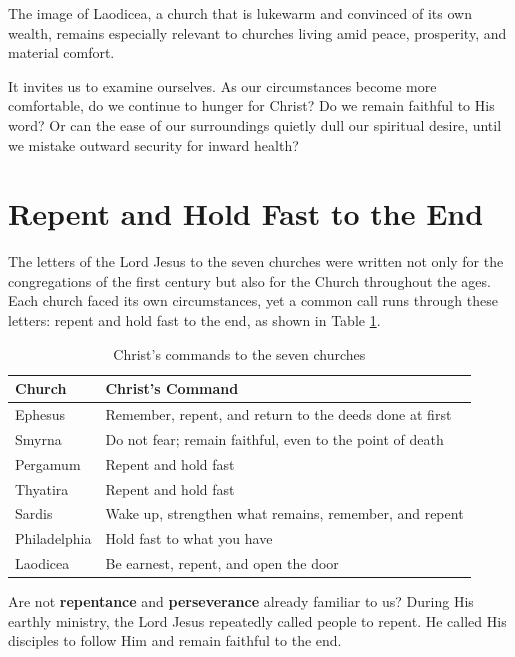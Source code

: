 The image of Laodicea, a church that is lukewarm and convinced of its own wealth, remains especially relevant to churches living amid peace, prosperity, and material comfort.

It invites us to examine ourselves. As our circumstances become more comfortable, do we continue to hunger for Christ? Do we remain faithful to His word? Or can the ease of our surroundings quietly dull our spiritual desire, until we mistake outward security for inward health?


\section{Repent and Hold Fast to the End}

The letters of the Lord Jesus to the seven churches were written not only for the congregations of the first century but also for the Church throughout the ages. Each church faced its own circumstances, yet a common call runs through these letters: repent and hold fast to the end, as shown in Table \ref{table:seven_commands}.

{
\renewcommand{\arraystretch}{1}
\small
\begin{longtable}{p{2.5cm}| p{6.5cm}}
\caption{Christ's commands to the seven churches}
\label{table:seven_commands} \\
\hline
\textbf{Church} &
\textbf{Christ's Command}
\\
\hline
Ephesus &
Remember, repent, and return to the deeds done at first
\\
Smyrna &
Do not fear; remain faithful, even to the point of death
\\
Pergamum &
Repent and hold fast
\\
Thyatira &
Repent and hold fast
\\
Sardis &
Wake up, strengthen what remains, remember, and repent
\\
Philadelphia &
Hold fast to what you have
\\
Laodicea &
Be earnest, repent, and open the door
\\
\hline
\end{longtable}
}

Are not \textbf{repentance} and \textbf{perseverance} already familiar to us? During His earthly ministry, the Lord Jesus repeatedly called people to repent. He called His disciples to follow Him and remain faithful to the end.

